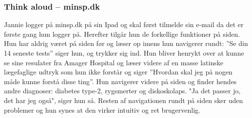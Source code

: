 \subsubsection*{Think aloud – minsp.dk}
Jannie logger på minsp.dk på sin Ipad og skal først tilmelde sin e-mail da det er første gang hun logger på. Herefter tilgår hun de forkellige funktioner på siden. Hun har aldrig været på siden før og  læser op imens hun navigerer rundt: ”Se din 14 seneste tests” siger hun, og trykker sig ind. Hun bliver henrykt over at kunne se sine resulater fra Amager Hospital og læser videre af en masse latinske lægefaglige udtryk som hun ikke forstår og siger ”Hvordan skal jeg på nogen måde kunne forstå disse ting”. Hun navigerer videre på siden og finder hendes andre diagnoser: diabetes type-2, rygsmerter og diskoskolaps. "Ja det passer jo, det har jeg også", siger hun så. Resten af navigationen rundt på siden sker uden problemer og hun synes at den virker intuitiv og ret brugervenlig. 